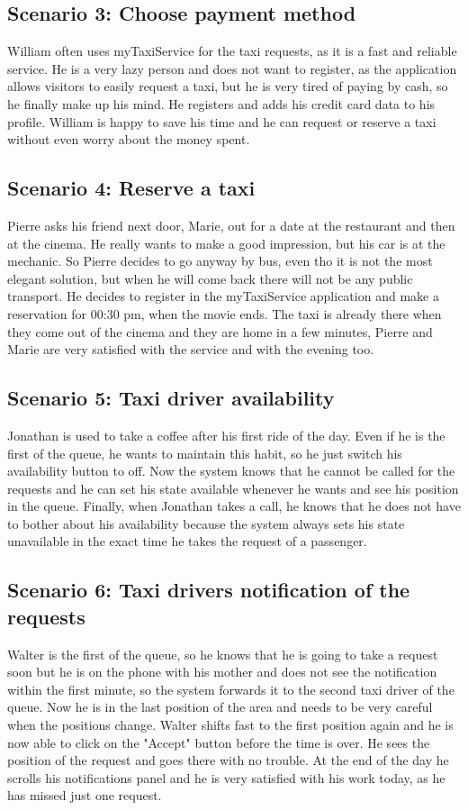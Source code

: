 \documentclass[18pt,oneside,a4paper, titlepage]{article}
\begin{document}
	\subsection{Scenario 3: Choose payment method}
		William often uses myTaxiService for the taxi requests, as it is a fast and reliable service. He is a very lazy person and does not want to register, as the application allows visitors to easily request a taxi, but he is very tired of paying by cash, so he finally make up his mind. He registers and adds his credit card data to his profile. William is happy to save his time and he can request or reserve a taxi without even worry about the money spent.
	
	\subsection{Scenario 4: Reserve a taxi}
		Pierre asks his friend next door, Marie, out for a date at the restaurant and then at the cinema. He really wants to make a good impression, but his car is at the mechanic. So Pierre decides to go anyway by bus, even tho it is not the most elegant solution, but when he will come back there will not be any public transport. He decides to register in the myTaxiService application and make a reservation for 00:30 pm, when the movie ends. The taxi is already there when they come out of the cinema and they are home in a few minutes, Pierre and Marie are very satisfied with the service and with the evening too.
		\newpage
	\subsection{Scenario 5: Taxi driver availability}
		Jonathan is used to take a coffee after his first ride of the day. Even if he is the first of the queue, he wants to maintain this habit, so he just switch his availability button to off. Now the system knows that he cannot be called for the requests and he can set his state available whenever he wants and see his position in the queue. Finally, when Jonathan takes a call, he knows that he does not have to bother about his availability because the system always sets his state unavailable in the exact time he takes the request of a passenger.
		
	\subsection{Scenario 6: Taxi drivers notification of the requests}
		Walter is the first of the queue, so he knows that he is going to take a request soon but he is on the phone with his mother and does not see the notification within the first minute, so the system forwards it to the second taxi driver of the queue. Now he is in the last position of the area and needs to be very careful when the positions change. Walter shifts fast to the first position again and he is now able to click on the "Accept" button before the time is over. He sees the position of the request and goes there with no trouble. At the end of the day he scrolls his notifications panel and he is very satisfied with his work today, as he has missed just one request.
\newpage
\end{document}
